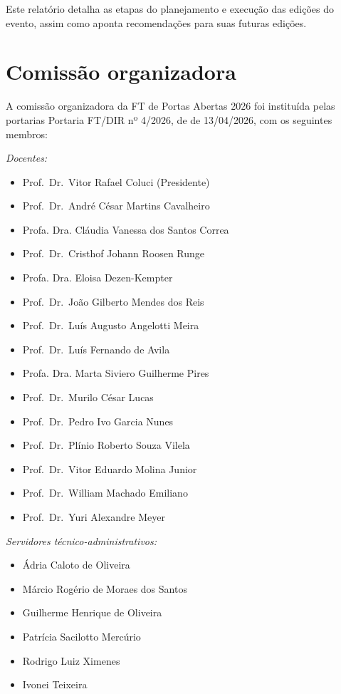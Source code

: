 \documentclass[
  letterpaper,
  DIV=11,
  numbers=noendperiod]{scrreprt}
\begin{document}
Este relatório detalha as etapas do planejamento e execução das edições
do evento, assim como aponta recomendações para suas futuras edições.

\chapter{Comissão organizadora}\label{comissuxe3o-organizadora-1}

A comissão organizadora da FT de Portas Abertas 2026 foi instituída
pelas portarias Portaria FT/DIR nº 4/2026, de de 13/04/2026, com os
seguintes membros:

\emph{Docentes:}

\begin{itemize}
\item
  Prof.~Dr.~Vitor Rafael Coluci (Presidente)
\item
  Prof.~Dr.~André César Martins Cavalheiro
\item
  Profa. Dra. Cláudia Vanessa dos Santos Correa
\item
  Prof.~Dr.~Cristhof Johann Roosen Runge
\item
  Profa. Dra. Eloisa Dezen-Kempter
\item
  Prof.~Dr.~João Gilberto Mendes dos Reis
\item
  Prof.~Dr.~Luís Augusto Angelotti Meira
\item
  Prof.~Dr.~Luís Fernando de Avila
\item
  Profa. Dra. Marta Siviero Guilherme Pires
\item
  Prof.~Dr.~Murilo César Lucas
\item
  Prof.~Dr.~Pedro Ivo Garcia Nunes
\item
  Prof.~Dr.~Plínio Roberto Souza Vilela
\item
  Prof.~Dr.~Vitor Eduardo Molina Junior
\item
  Prof.~Dr.~William Machado Emiliano
\item
  Prof.~Dr.~Yuri Alexandre Meyer
\end{itemize}

\emph{Servidores técnico-administrativos:}

\begin{itemize}
\item
  Ádria Caloto de Oliveira
\item
  Márcio Rogério de Moraes dos Santos
\item
  Guilherme Henrique de Oliveira
\item
  Patrícia Sacilotto Mercúrio
\item
  Rodrigo Luiz Ximenes
\item
  Ivonei Teixeira
\end{itemize}
\end{document}
